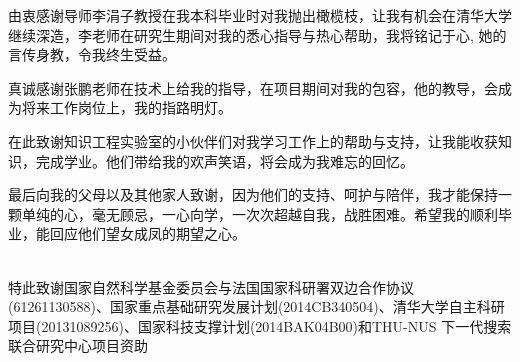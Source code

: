 \begin{ack}
  由衷感谢导师李涓子教授在我本科毕业时对我抛出橄榄枝，让我有机会在清华大学继续深造，李老师在研究生期间对我的悉心指导与热心帮助，我将铭记于心, 她的言传身教，令我终生受益。

  真诚感谢张鹏老师在技术上给我的指导，在项目期间对我的包容，他的教导，会成为将来工作岗位上，我的指路明灯。

  在此致谢知识工程实验室的小伙伴们对我学习工作上的帮助与支持，让我能收获知识，完成学业。他们带给我的欢声笑语，将会成为我难忘的回忆。

  最后向我的父母以及其他家人致谢，因为他们的支持、呵护与陪伴，我才能保持一颗单纯的心，毫无顾忌，一心向学，一次次超越自我，战胜困难。希望我的顺利毕业，能回应他们望女成凤的期望之心。

~\\

  特此致谢国家自然科学基金委员会与法国国家科研署双边合作协议(61261130588)、国家重点基础研究发展计划(2014CB340504)、清华大学自主科研项目(20131089256)、国家科技支撑计划(2014BAK04B00)和THU-NUS 下一代搜索联合研究中心项目资助

\end{ack}
